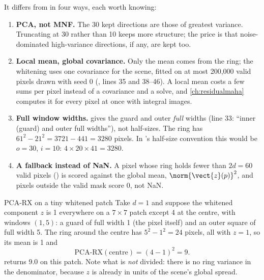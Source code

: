 It differs from  in four ways, each worth knowing:
\begin{enumerate}
  \item \textbf{PCA, not MNF.} The 30 kept directions are those of greatest variance. Truncating at
    30 rather than 10 keeps more structure; the price is that noise-dominated high-variance
    directions, if any, are kept too.
  \item \textbf{Local mean, global covariance.} Only the mean comes from the ring; the whitening uses one
    covariance for the scene, fitted on at most 200,000 valid pixels drawn with seed 0
    (, lines 35 and 38--46). A local mean costs a few sums per pixel
    instead of a covariance and a solve, and \cref{ch:residualmaha} computes it for every pixel at
    once with integral images.
  \item \textbf{Full window widths.}  gives the guard and outer
    \emph{full} widths (line 33: ``inner (guard) and outer full widths''), not half-sizes. The ring has
    $61^2 - 21^2 = 3721 - 441 = 3280$ pixels. In 's half-size convention this would
    be $o = 30$, $i = 10$: $4\times20\times41 = 3280$.
  \item \textbf{A fallback instead of NaN.} A pixel whose ring holds fewer than $2d = 60$ valid pixels
    () is scored against the global mean, $\norm{\vect{z}(p)}^2$, and pixels
    outside the valid mask score 0, not NaN.
\end{enumerate}

\begin{worked}[label={we:localrx:pcarx}]{PCA-RX on a tiny whitened patch}
Take $d = 1$ and suppose the whitened component $z$ is 1 everywhere on a $7\times7$ patch except 4 at
the centre, with windows $(1, 5)$: a guard of full width 1 (the pixel itself) and an outer square of full
width 5. The ring around the centre has $5^2 - 1^2 = 24$ pixels, all with $z = 1$, so its mean is 1 and
\[
\text{PCA-RX}(\text{centre}) = (4 - 1)^2 = 9 .
\]
 returns 9.0 on this patch\tagC. Note what is \emph{not} divided: there is no
ring variance in the denominator, because $z$ is already in units of the scene's global spread.
\end{worked}

